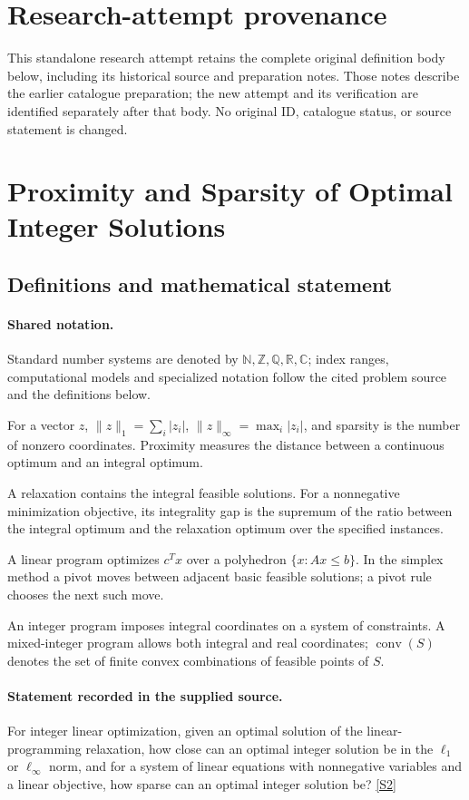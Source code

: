 \documentclass[11pt]{article}
\begin{document}
\section*{Research-attempt provenance}
This standalone research attempt retains the complete original definition body below,
including its historical source and preparation notes. Those notes describe the
earlier catalogue preparation; the new attempt and its verification are identified
separately after that body. No original ID, catalogue status, or source statement is changed.

\section{Proximity and Sparsity of Optimal Integer Solutions}\label{statement}

\subsection{Definitions and mathematical statement}

\paragraph{Shared notation.}Standard number systems are denoted by $\mathbb N,\mathbb Z,\mathbb Q,\mathbb R,\mathbb C$; index ranges, computational models and specialized notation follow the cited problem source and the definitions below.


For a vector $z$, $\lVert z\rVert_1=\sum_i|z_i|$, $\lVert z\rVert_\infty=\max_i|z_i|$, and sparsity is the number of nonzero coordinates. Proximity measures the distance between a continuous optimum and an integral optimum.

A relaxation contains the integral feasible solutions. For a nonnegative minimization objective, its integrality gap is the supremum of the ratio between the integral optimum and the relaxation optimum over the specified instances.

A linear program optimizes $c^Tx$ over a polyhedron $\{x:Ax\leq b\}$. In the simplex method a pivot moves between adjacent basic feasible solutions; a pivot rule chooses the next such move.

An integer program imposes integral coordinates on a system of constraints. A mixed-integer program allows both integral and real coordinates; $\operatorname{conv}(S)$ denotes the set of finite convex combinations of feasible points of $S$.
\paragraph{Statement recorded in the supplied source.}
For integer linear optimization, given an optimal solution of the linear-programming relaxation, how close can an optimal integer solution be in the $\ell_1$ or $\ell_\infty$ norm, and for a system of linear equations with nonnegative variables and a linear objective, how sparse can an optimal integer solution be? \href{https://doi.org/10.4171/owr/2018/50}{[S2]}
\end{document}
